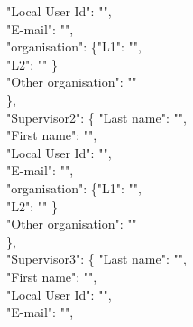 {\begin{flushleft}
    \fi
    \ifx\@supervisorAsKTHID\@empty\relax
    \else
    "Local User Id": "\@supervisorAsKTHID",\\
    \fi
    \ifx\@supervisorAsEmail\@empty\relax
    \else
    "E-mail": "\@supervisorAsEmail",\\
    \fi
    \ifx\@supervisorAsOrganization\@empty
    \ifx\@supervisorAsSchool\@empty\relax
    \else
    "organisation": \{"L1": "\@supervisorAsSchool",\\
    \ifx\@supervisorAsDepartment\@empty\relax
    \else
    "L2": "\@supervisorAsDepartment"
    \fi
    \}\\
    \fi
    \else
    "Other organisation": "\@supervisorAsOrganization"\\
    \fi
    \},\\
    \fi
    \ifx\@supervisorBsLastname\@empty\relax
    \else
    "Supervisor2": \{ "Last name": "\@supervisorBsLastname",\\
    \ifx\@supervisorBsFirstname\@empty\relax
    \else
    "First name": "\@supervisorBsFirstname",\\
    \fi
    \ifx\@supervisorBsKTHID\@empty\relax
    \else
    "Local User Id": "\@supervisorBsKTHID",\\
    \fi
    \ifx\@supervisorBsEmail\@empty\relax
    \else
    "E-mail": "\@supervisorBsEmail",\\
    \fi
    \ifx\@supervisorBsOrganization\@empty
    \ifx\@supervisorBsSchool\@empty\relax
    \else
    "organisation": \{"L1": "\@supervisorBsSchool",\\
    \ifx\@supervisorBsDepartment\@empty\relax
    \else
    "L2": "\@supervisorBsDepartment"
    \fi
    \}\\
    \fi
    \else
    "Other organisation": "\@supervisorBsOrganization"\\
    \fi
    \},\\
    \fi
    \ifx\@supervisorCsLastname\@empty\relax
    \else
    "Supervisor3": \{ "Last name": "\@supervisorCsLastname",\\
    \ifx\@supervisorCsFirstname\@empty\relax
    \else
    "First name": "\@supervisorCsFirstname",\\
    \fi
    \ifx\@supervisorCsKTHID\@empty\relax
    \else
    "Local User Id": "\@supervisorCsKTHID",\\
    \fi
    \ifx\@supervisorCsEmail\@empty\relax
    \else
    "E-mail": "\@supervisorCsEmail",\\
    \fi
    \ifx\@supervisorCsOrganization\@empty
    \ifx\@supervisorCsSchool\@empty\relax
    \else

\end{flushleft}}
